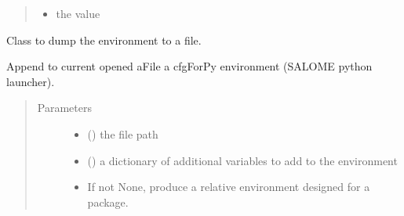 \documentclass[a4paper,10pt,english]{sphinxmanual}
\begin{document}
\begin{fulllineitems}
\begin{fulllineitems}
\begin{quote}
\begin{description}
\begin{itemize}
\item {} 
 \textendash{} the value

\end{itemize}

\end{description}\end{quote}

\end{fulllineitems}


\end{fulllineitems}


\begin{fulllineitems}
\label{\detokenize{commands/apidoc/src:src.environment.FileEnvWriter}}
Class to dump the environment to a file.

\begin{fulllineitems}
\label{\detokenize{commands/apidoc/src:src.environment.FileEnvWriter.write_cfgForPy_file}}
Append to current opened aFile a cfgForPy 
environment (SALOME python launcher).
\begin{quote}\begin{description}
\item[{Parameters}] \leavevmode\begin{itemize}
\item {} 
 () \textendash{} the file path

\item {} 
 () \textendash{} a dictionary of additional variables 
to add to the environment

\item {} 
 \textendash{} If not None, produce a relative environment 
designed for a package.


\end{itemize}
\end{description}
\end{quote}
\end{fulllineitems}
\end{fulllineitems}
\end{document}

